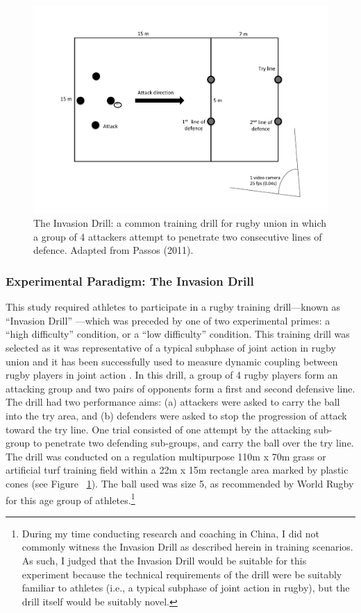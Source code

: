\begin{CJK}{UTF8}{gbsn}
\begin{figure}[htbp]
  \centering
      \includegraphics[width=0.9\linewidth,keepaspectratio] {images/invasionDrill}
      \caption{The Invasion Drill: a common training drill for rugby union in which a group of 4 attackers attempt to penetrate two consecutive lines of defence. Adapted from Passos (2011).}
      \label{fig:invasionDrill}
  \end{figure}


\subsubsection{Experimental Paradigm: The Invasion Drill}
This study required athletes to participate in a rugby training drill---known as ``Invasion Drill'' \citep{Biscombe1998}---which was preceded by one of two experimental primes: a ``high difficulty'' condition, or a ``low difficulty'' condition.  This training drill was selected as it was representative of a typical subphase of joint action in rugby union and it has been successfully used to measure dynamic coupling between rugby players in joint action \citep[see][]{Passos2011}.  In this drill, a group of 4 rugby players form an attacking group and two pairs of opponents form a first and second defensive line.  The drill had two performance aims: (a) attackers were asked to carry the ball into the try area, and (b) defenders were asked to stop the progression of attack toward the try line.
One trial consisted of one attempt by the attacking sub-group to penetrate two defending sub-groups, and carry the ball over the try line. The drill was conducted on a regulation multipurpose 110m x 70m grass or artificial turf training field within a 22m x 15m rectangle area marked by plastic cones (see Figure ~\ref{fig:invasionDrill}). The ball used was size 5, as recommended by World Rugby for this age group of athletes.\footnote{During my time conducting research and coaching in China, I did not commonly witness the Invasion Drill as described herein in training scenarios. As such, I judged that the Invasion Drill would be suitable for this experiment because the technical requirements of the drill were be suitably familiar to athletes (i.e., a typical subphase of joint action in rugby), but the drill itself would be suitably novel.}



\end{CJK}
